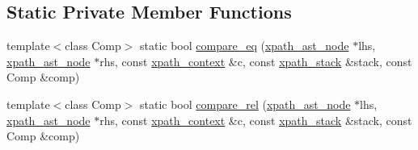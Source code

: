 \subsection*{Static Private Member Functions}
\begin{CompactItemize}
\item 
template$<$class Comp$>$ static bool \hyperlink{classxpath__ast__node_16805022b8f8b8f26061b11d0f8e01b5}{compare\_\-eq} (\hyperlink{classxpath__ast__node}{xpath\_\-ast\_\-node} $\ast$lhs, \hyperlink{classxpath__ast__node}{xpath\_\-ast\_\-node} $\ast$rhs, const \hyperlink{structxpath__context}{xpath\_\-context} \&c, const \hyperlink{structxpath__stack}{xpath\_\-stack} \&stack, const Comp \&comp)
\item 
template$<$class Comp$>$ static bool \hyperlink{classxpath__ast__node_055805c7365ac7d99174d2bf7a0cd5e2}{compare\_\-rel} (\hyperlink{classxpath__ast__node}{xpath\_\-ast\_\-node} $\ast$lhs, \hyperlink{classxpath__ast__node}{xpath\_\-ast\_\-node} $\ast$rhs, const \hyperlink{structxpath__context}{xpath\_\-context} \&c, const \hyperlink{structxpath__stack}{xpath\_\-stack} \&stack, const Comp \&comp)
\end{CompactItemize}
